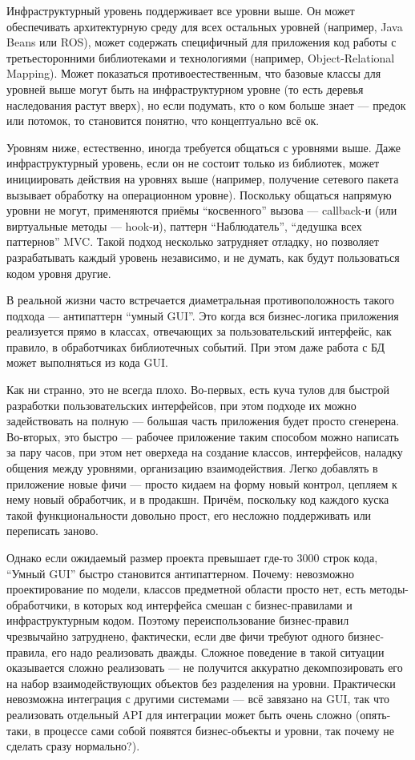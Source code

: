 \documentclass{../../text-style}
\begin{document}
Инфраструктурный уровень поддерживает все уровни выше. Он может обеспечивать архитектурную среду для всех остальных уровней (например, Java Beans или ROS), может содержать специфичный для приложения код работы с третьесторонними библиотеками и технологиями (например, Object-Relational Mapping). Может показаться противоестественным, что базовые классы для уровней выше могут быть на инфраструктурном уровне (то есть деревья наследования растут вверх), но если подумать, кто о ком больше знает --- предок или потомок, то становится понятно, что концептуально всё ок.

Уровням ниже, естественно, иногда требуется общаться с уровнями выше. Даже инфраструктурный уровень, если он не состоит только из библиотек, может инициировать действия на уровнях выше (например, получение сетевого пакета вызывает обработку на операционном уровне). Поскольку общаться напрямую уровни не могут, применяются приёмы ``косвенного'' вызова --- callback-и (или виртуальные методы --- hook-и), паттерн ``Наблюдатель'', ``дедушка всех паттернов'' MVC. Такой подход несколько затрудняет отладку, но позволяет разрабатывать каждый уровень независимо, и не думать, как будут пользоваться кодом уровня другие.

В реальной жизни часто встречается диаметральная противоположность такого подхода --- антипаттерн ``умный GUI''. Это когда вся бизнес-логика приложения реализуется прямо в классах, отвечающих за пользовательский интерфейс, как правило, в обработчиках библиотечных событий. При этом даже работа с БД может выполняться из кода GUI.

Как ни странно, это не всегда плохо. Во-первых, есть куча тулов для быстрой разработки пользовательских интерфейсов, при этом подходе их можно задействовать на полную --- большая часть приложения будет просто сгенерена. Во-вторых, это быстро --- рабочее приложение таким способом можно написать за пару часов, при этом нет оверхеда на создание классов, интерфейсов, наладку общения между уровнями, организацию взаимодействия. Легко добавлять в приложение новые фичи --- просто кидаем на форму новый контрол, цепляем к нему новый обработчик, и в продакшн. Причём, поскольку код каждого куска такой функциональности довольно прост, его несложно поддерживать или переписать заново.

Однако если ожидаемый размер проекта превышает где-то 3000 строк кода, ``Умный GUI'' быстро становится антипаттерном. Почему: невозможно проектирование по модели, классов предметной области просто нет, есть методы-обработчики, в которых код интерфейса смешан с бизнес-правилами и инфраструктурным кодом. Поэтому переиспользование бизнес-правил чрезвычайно затруднено, фактически, если две фичи требуют одного бизнес-правила, его надо реализовать дважды. Сложное поведение в такой ситуации оказывается сложно реализовать --- не получится аккуратно декомпозировать его на набор взаимодействующих объектов без разделения на уровни. Практически невозможна интеграция с другими системами --- всё завязано на GUI, так что реализовать отдельный API для интеграции может быть очень сложно (опять-таки, в процессе сами собой появятся бизнес-объекты и уровни, так почему не сделать сразу нормально?).
\end{document}
